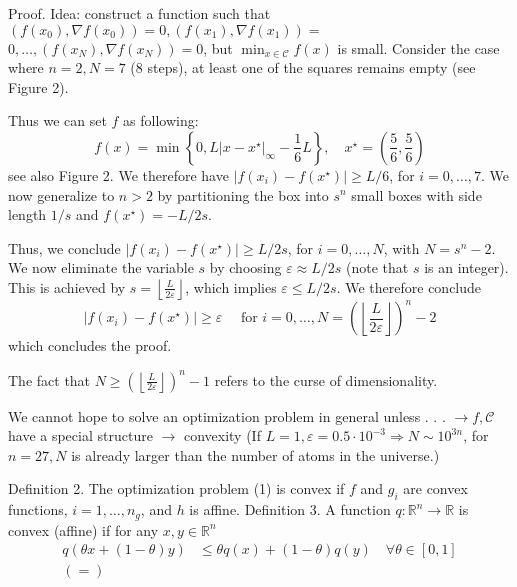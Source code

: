 Proof. Idea: construct a function such that $\left(f\left(x_{0}\right), \nabla f\left(x_{0}\right)\right)=0,\left(f\left(x_{1}\right), \nabla f\left(x_{1}\right)\right)=$ $0, \ldots,\left(f\left(x_{N}\right), \nabla f\left(x_{N}\right)\right)=0$, but $\min _{x \in \mathcal{C}} f(x)$ is small.
Consider the case where $n=2, N=7$ (8 steps), at least one of the squares remains empty (see Figure 2).

Thus we can set $f$ as following:
$$
	f(x)=\min \left\{0, L\left|x-x^{\star}\right|_{\infty}-\frac{1}{6} L\right\}, \quad x^{\star}=\left(\frac{5}{6}, \frac{5}{6}\right)
$$
see also Figure 2.
We therefore have $\left|f\left(x_{i}\right)-f\left(x^{\star}\right)\right| \geqslant L / 6$, for $i=0, \ldots, 7$.
We now generalize to $n>2$ by partitioning the box into $s^{n}$ small boxes with side length $1 / s$ and $f\left(x^{\star}\right)=-L / 2 s$.

Thus, we conclude $\left|f\left(x_{i}\right)-f\left(x^{\star}\right)\right| \geqslant L / 2 s$, for $i=0, \ldots, N$, with $N=s^{n}-2$.
We now eliminate the variable $s$ by choosing $\varepsilon \approx L / 2 s$ (note that $s$ is an integer). This is achieved by $s=\left\lfloor\frac{L}{2 \varepsilon}\right\rfloor$, which implies $\varepsilon \leqslant L / 2 s$.
We therefore conclude
$$
	\left|f\left(x_{i}\right)-f\left(x^{\star}\right)\right| \geqslant \varepsilon \quad \text { for } i=0, \ldots, N=\left(\left\lfloor\frac{L}{2 \varepsilon}\right\rfloor\right)^{n}-2
$$
which concludes the proof.

The fact that $N \geq\left(\left\lfloor\frac{L}{2 \varepsilon}\right\rfloor\right)^{n}-1$ refers to the curse of dimensionality.

We cannot hope to solve an optimization problem in general unless . . .
$\rightarrow f, \mathcal{C}$ have a special structure
$\rightarrow$ convexity
(If $L=1, \varepsilon=0.5 \cdot 10^{-3} \Rightarrow N \sim 10^{3 n}$, for $n=27, N$ is already larger than the number of atoms in the universe.)

Definition 2. The optimization problem (1) is convex if $f$ and $g_{i}$ are convex functions, $i=1, \ldots, n_{g}$, and $h$ is affine.
Definition 3. A function $q: \mathbb{R}^{n} \rightarrow \mathbb{R}$ is convex (affine) if for any $x, y \in \mathbb{R}^{n}$
$$
	\begin{aligned}
		q(\theta x+(1-\theta) y) & \leq \theta q(x)+(1-\theta) q(y) \quad \forall \theta \in[0,1] \\
		(=)                      &
	\end{aligned}
$$

